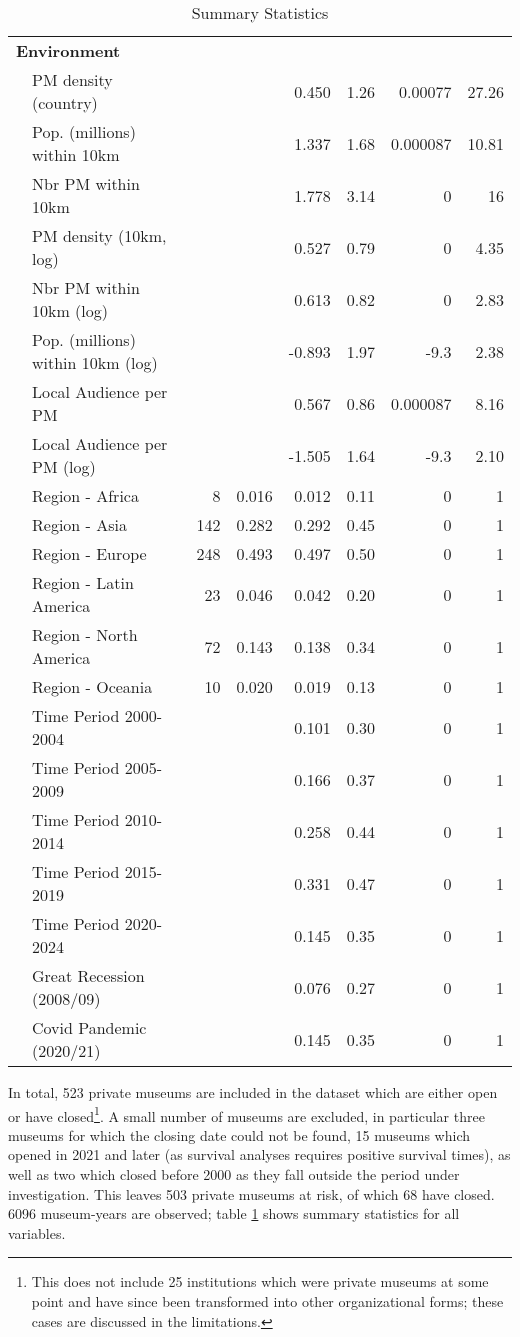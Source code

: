 \documentclass[12pt]{article}
\begin{document}
\begin{table}[ht]
\begin{tabular}{llrrrrrr}
   \multicolumn{8}{l}{\textbf{Environment}} \\ 
 & PM density (country) &  &  &    0.450 &  1.26 & 0.00077 & 27.26 \\ 
   & Pop. (millions) within 10km &  &  &    1.337 &  1.68 & 0.000087 & 10.81 \\ 
   & Nbr PM within 10km &  &  &    1.778 &  3.14 & 0 & 16 \\ 
   & PM density (10km, log) &  &  &    0.527 &  0.79 & 0 & 4.35 \\ 
   & Nbr PM within 10km (log) &  &  &    0.613 &  0.82 & 0 & 2.83 \\ 
   & Pop. (millions) within 10km (log) &  &  &   -0.893 &  1.97 & -9.3 & 2.38 \\ 
   & Local Audience per PM &  &  &    0.567 &  0.86 & 0.000087 & 8.16 \\ 
   & Local Audience per PM (log) &  &  &   -1.505 &  1.64 & -9.3 & 2.10 \\ 
   & Region - Africa & 8 & 0.016 &    0.012 &  0.11 & 0 & 1 \\ 
   & Region - Asia & 142 & 0.282 &    0.292 &  0.45 & 0 & 1 \\ 
   & Region - Europe & 248 & 0.493 &    0.497 &  0.50 & 0 & 1 \\ 
   & Region - Latin America & 23 & 0.046 &    0.042 &  0.20 & 0 & 1 \\ 
   & Region - North America & 72 & 0.143 &    0.138 &  0.34 & 0 & 1 \\ 
   & Region - Oceania & 10 & 0.020 &    0.019 &  0.13 & 0 & 1 \\ 
   & Time Period 2000-2004 &  &  &    0.101 &  0.30 & 0 & 1 \\ 
   & Time Period 2005-2009 &  &  &    0.166 &  0.37 & 0 & 1 \\ 
   & Time Period 2010-2014 &  &  &    0.258 &  0.44 & 0 & 1 \\ 
   & Time Period 2015-2019 &  &  &    0.331 &  0.47 & 0 & 1 \\ 
   & Time Period 2020-2024 &  &  &    0.145 &  0.35 & 0 & 1 \\ 
   & Great Recession (2008/09) &  &  &    0.076 &  0.27 & 0 & 1 \\ 
   & Covid Pandemic (2020/21) &  &  &    0.145 &  0.35 & 0 & 1 \\ 
   \hline
\end{tabular}
\caption{Summary Statistics} 
\label{tbl:t_sumstats}
\end{table}

In total, 523 private museums are included in the dataset which are either open or have closed\footnote{This does not include 25 institutions which were private museums at some point and have since been transformed into other organizational forms; these cases are discussed in the limitations.}.
A small number of museums are excluded, in particular three museums for which the closing date could not be found, 15 museums which opened in 2021 and later (as survival analyses requires positive survival times), as well as two which closed before 2000 as they fall outside the period under investigation.
This leaves 503 private museums at risk, of which 68 have closed.
6096 museum-years are observed; table \ref{tbl:t_sumstats} shows summary statistics for all variables.
\end{document}
